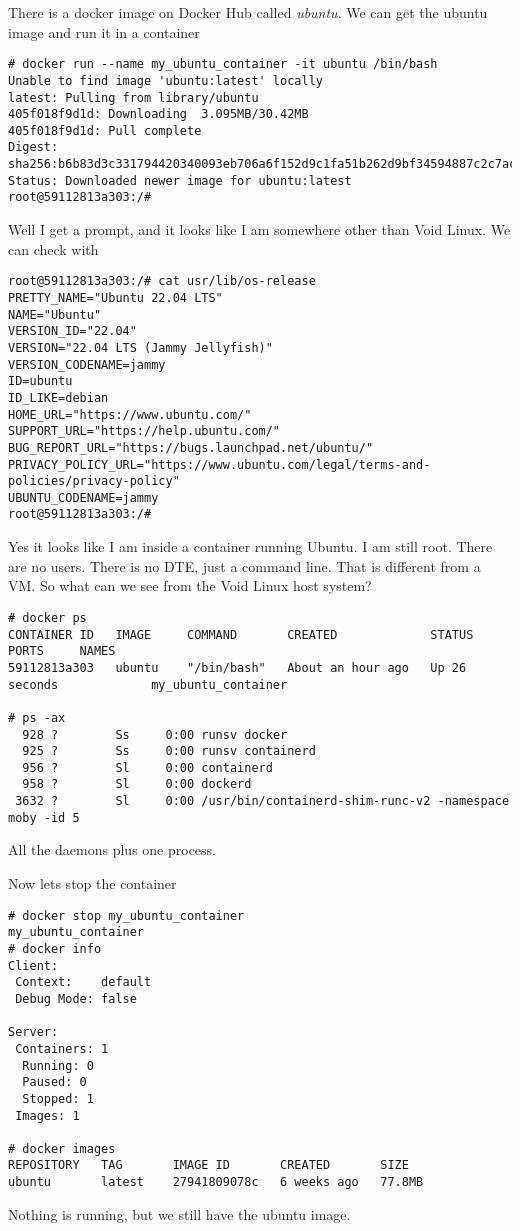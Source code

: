 \documentclass{article}  %
\begin{document}
There is a docker image on Docker Hub called {\em ubuntu}.
We can get the ubuntu image and run it in a container
\begin{verbatim}
# docker run --name my_ubuntu_container -it ubuntu /bin/bash
Unable to find image 'ubuntu:latest' locally
latest: Pulling from library/ubuntu
405f018f9d1d: Downloading  3.095MB/30.42MB
405f018f9d1d: Pull complete 
Digest: sha256:b6b83d3c331794420340093eb706a6f152d9c1fa51b262d9bf34594887c2c7ac
Status: Downloaded newer image for ubuntu:latest
root@59112813a303:/# 
\end{verbatim}
 Well I get a prompt, and it looks like I am somewhere other than Void Linux. We can check with
\begin{verbatim}
root@59112813a303:/# cat usr/lib/os-release
PRETTY_NAME="Ubuntu 22.04 LTS"
NAME="Ubuntu"
VERSION_ID="22.04"
VERSION="22.04 LTS (Jammy Jellyfish)"
VERSION_CODENAME=jammy
ID=ubuntu
ID_LIKE=debian
HOME_URL="https://www.ubuntu.com/"
SUPPORT_URL="https://help.ubuntu.com/"
BUG_REPORT_URL="https://bugs.launchpad.net/ubuntu/"
PRIVACY_POLICY_URL="https://www.ubuntu.com/legal/terms-and-policies/privacy-policy"
UBUNTU_CODENAME=jammy
root@59112813a303:/# 
\end{verbatim}

Yes it looks like I am inside a container running Ubuntu. I am still root. There are no users. There is no DTE, just a command line. That is different from a VM.  
So what can we see from the Void Linux host system?
\begin{verbatim}
# docker ps
CONTAINER ID   IMAGE     COMMAND       CREATED             STATUS          PORTS     NAMES
59112813a303   ubuntu    "/bin/bash"   About an hour ago   Up 26 seconds             my_ubuntu_container

# ps -ax
  928 ?        Ss     0:00 runsv docker
  925 ?        Ss     0:00 runsv containerd
  956 ?        Sl     0:00 containerd
  958 ?        Sl     0:00 dockerd
 3632 ?        Sl     0:00 /usr/bin/containerd-shim-runc-v2 -namespace moby -id 5
\end{verbatim}
 All the daemons plus one process. 

Now lets stop the container
\begin{verbatim}
# docker stop my_ubuntu_container
my_ubuntu_container
# docker info
Client:
 Context:    default
 Debug Mode: false

Server:
 Containers: 1
  Running: 0
  Paused: 0
  Stopped: 1
 Images: 1

# docker images
REPOSITORY   TAG       IMAGE ID       CREATED       SIZE
ubuntu       latest    27941809078c   6 weeks ago   77.8MB

\end{verbatim}
Nothing is running, but we still have the ubuntu image.
\end{document}

